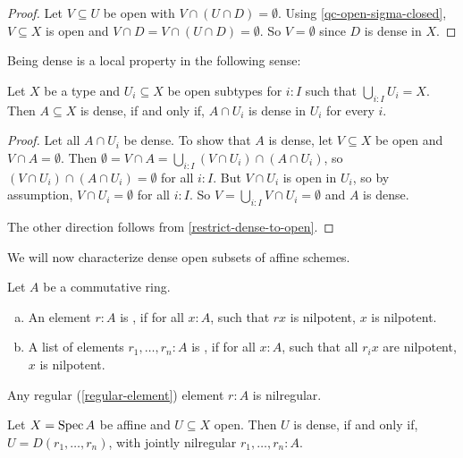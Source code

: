 \begin{proof}
  Let $V\subseteq U$ be open with $V \cap (U\cap D)=\emptyset$.
  Using \cref{qc-open-sigma-closed}, $V\subseteq X$ is open
  and $V\cap D = V\cap (U\cap D)=\emptyset$.
  So $V=\emptyset$ since $D$ is dense in $X$.
\end{proof}

Being dense is a local property in the following sense:

\begin{lemma}%
  \label{dense-local}
  Let $X$ be a type
  and $U_i\subseteq X$ be open subtypes for $i:I$ such that $\bigcup_{i:I}U_i=X$.
  Then $A\subseteq X$ is dense, if and only if,
  $A\cap U_i$ is dense in $U_i$ for every $i$.
\end{lemma}

\begin{proof}
  Let all $A\cap U_i$ be dense.
  To show that $A$ is dense, let $V\subseteq X$ be open and $V\cap A= \emptyset$.
  Then $\emptyset=V\cap A=\bigcup_{i:I}(V\cap U_i)\cap (A\cap U_i)$,
  so $(V\cap U_i)\cap (A\cap U_i) = \emptyset$ for all $i:I$.
  But $V\cap U_i$ is open in $U_i$, so by assumption, $V\cap U_i=\emptyset$ for all $i:I$.
  So $V=\bigcup_{i:I}V\cap U_i=\emptyset$ and $A$ is dense.

  The other direction follows from \cref{restrict-dense-to-open}.
\end{proof}

We will now characterize dense open subsets of affine schemes.

\begin{definition}
  Let $A$ be a commutative ring.
  \begin{enumerate}[(a)]
  \item An element $r:A$ is , if for all $x:A$, such that $rx$ is nilpotent, $x$ is nilpotent.
  \item A list of elements $r_1,\dots,r_n:A$ is , if for all $x:A$,
    such that all $r_ix$ are nilpotent, $x$ is nilpotent.
  \end{enumerate}
\end{definition}

\begin{proposition}
  Any regular (\cref{regular-element}) element $r:A$ is nilregular.
\end{proposition}

\begin{lemma}%
  \label{affine-open-dense-nilregular}
  Let $X=\operatorname{Spec} A$ be affine and $U\subseteq X$ open.
  Then $U$ is dense, if and only if,
  $U=D(r_1,\dots,r_n)$, with jointly nilregular $r_1,\dots,r_n:A$.
\end{lemma}

